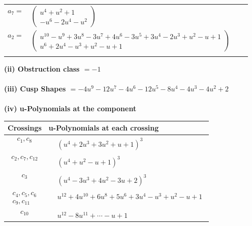 \documentclass[1p]{elsarticle_modified}
\theoremstyle{definition}
\begin{document}
\begin{tabular}{m{7pt} m{180pt} m{7pt} m{180pt} }
\flushright $a_{7}=$&$\begin{pmatrix}u^4+u^2+1\\- u^6-2 u^4- u^2\end{pmatrix}$ \\
\flushright $a_{2}=$&$\begin{pmatrix}u^{10}- u^9+3 u^8-3 u^7+4 u^6-3 u^5+3 u^4-2 u^3+u^2- u+1\\u^6+2 u^4- u^3+u^2- u+1\end{pmatrix}$\\&\end{tabular}
\flushleft \textbf{(ii) Obstruction class $= -1$}\\~\\
\flushleft \textbf{(iii) Cusp Shapes $= -4 u^9-12 u^7-4 u^6-12 u^5-8 u^4-4 u^3-4 u^2+2$}\\~\\
\newpage\renewcommand{\arraystretch}{1}
\flushleft \textbf{(iv) u-Polynomials at the component}\newline \\
\begin{tabular}{m{50pt}|m{274pt}}
Crossings & \hspace{64pt}u-Polynomials at each crossing \\
\hline $$\begin{aligned}c_{1},c_{8}\end{aligned}$$&$\begin{aligned}
&(u^4+2 u^3+3 u^2+u+1)^3
\end{aligned}$\\
\hline $$\begin{aligned}c_{2},c_{7},c_{12}\end{aligned}$$&$\begin{aligned}
&(u^4+u^2- u+1)^3
\end{aligned}$\\
\hline $$\begin{aligned}c_{3}\end{aligned}$$&$\begin{aligned}
&(u^4-3 u^3+4 u^2-3 u+2)^3
\end{aligned}$\\
\hline $$\begin{aligned}c_{4},c_{5},c_{6}\\c_{9},c_{11}\end{aligned}$$&$\begin{aligned}
&u^{12}+4 u^{10}+6 u^8+5 u^6+3 u^4- u^3+u^2- u+1
\end{aligned}$\\
\hline $$\begin{aligned}c_{10}\end{aligned}$$&$\begin{aligned}
&u^{12}-8 u^{11}+\cdots- u+1
\end{aligned}$\\
\hline
\end{tabular}\\~\\
\end{document}
